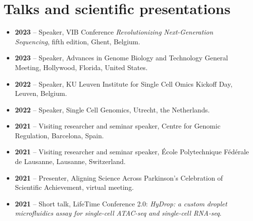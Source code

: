 \section*{Talks and scientific presentations}
\begin{itemize}
    \item \textbf{2023} -- Speaker, VIB Conference \emph{Revolutionizing Next-Generation Sequencing}, fifth edition, Ghent, Belgium.
    \item \textbf{2023} -- Speaker, Advances in Genome Biology and Technology General Meeting, Hollywood, Florida, United States.
    \item \textbf{2022} -- Speaker, KU Leuven Institute for Single Cell Omics Kickoff Day, Leuven, Belgium.
    \item \textbf{2022} -- Speaker, Single Cell Genomics, Utrecht, the Netherlands.
    \item \textbf{2021} -- Visiting researcher and seminar speaker, Centre for Genomic Regulation, Barcelona, Spain.
    \item \textbf{2021} -- Visiting researcher and seminar speaker, \'Ecole Polytechnique F\'ed\'erale de Lausanne, Lausanne, Switzerland.
    \item \textbf{2021} -- Presenter, Aligning Science Across Parkinson's Celebration of Scientific Achievement, virtual meeting.
    \item \textbf{2021} -- Short talk, LifeTime Conference 2.0: \emph{HyDrop: a custom droplet microfluidics assay for single-cell ATAC-seq and single-cell RNA-seq}.
\end{itemize}

\endgroup

